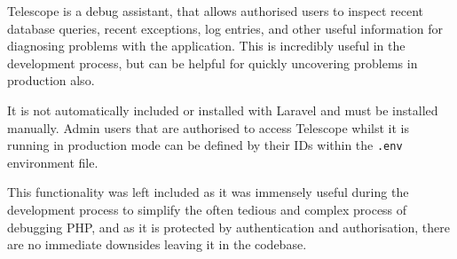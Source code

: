 Telescope is a debug assistant, that allows authorised users to inspect recent database queries, recent exceptions, log entries, and other useful information for diagnosing problems with the application. This is incredibly useful in the development process, but can be helpful for quickly uncovering problems in production also. \cite{Laravel11} \cite{Abati1}

It is not automatically included or installed with Laravel and must be installed manually. Admin users that are authorised to access Telescope whilst it is running in production mode can be defined by their IDs within the \texttt{.env} environment file.

This functionality was left included as it was immensely useful during the development process to simplify the often tedious and complex process of debugging PHP, and as it is protected by authentication and authorisation, there are no immediate downsides leaving it in the codebase.